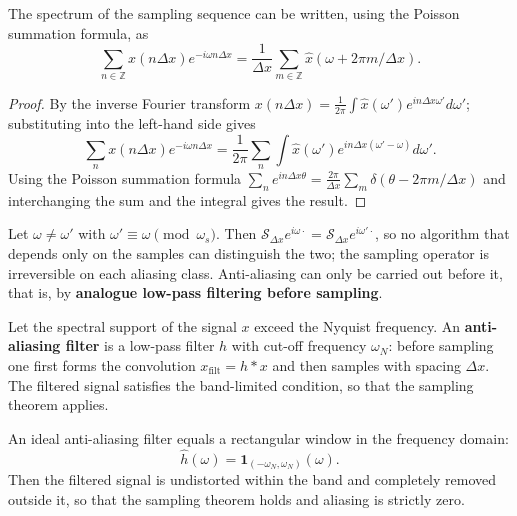 \begin{lemma}\label{lem:poisson_summation_sampling}
The spectrum of the sampling sequence can be written, using the Poisson summation formula, as
\[
\sum_{n\in\mathbb{Z}}x(n\Delta x)e^{-i\omega n\Delta x}
=\frac{1}{\Delta x}\sum_{m\in\mathbb{Z}}\hat x(\omega+2\pi m/\Delta x).
\]
\end{lemma}

\begin{proof}
By the inverse Fourier transform $x(n\Delta x)=\frac{1}{2\pi}\int\hat x(\omega')e^{in\Delta x\omega'}d\omega'$; substituting into the left-hand side gives
\[
\sum_n x(n\Delta x)e^{-i\omega n\Delta x}=\frac{1}{2\pi}\sum_n\int\hat x(\omega')e^{in\Delta x(\omega'-\omega)}d\omega'.
\]
Using the Poisson summation formula $\sum_ne^{in\Delta x\theta}=\frac{2\pi}{\Delta x}\sum_m\delta(\theta-2\pi m/\Delta x)$ and interchanging the sum and the integral gives the result.
\end{proof}

\begin{corollary}\label{cor:aliasing_irreversibility_parallel}
Let $\omega\ne\omega'$ with $\omega'\equiv\omega\pmod{\omega_s}$. Then $\mathcal{S}_{\Delta x}e^{i\omega\cdot}=\mathcal{S}_{\Delta x}e^{i\omega'\cdot}$, so no algorithm that depends only on the samples can distinguish the two; the sampling operator is irreversible on each aliasing class. Anti-aliasing can only be carried out before it, that is, by \textbf{analogue low-pass filtering before sampling}.
\end{corollary}

\begin{definition}\label{def:anti_aliasing_filter}
Let the spectral support of the signal $x$ exceed the Nyquist frequency. An \textbf{anti-aliasing filter} is a low-pass filter $h$ with cut-off frequency $\omega_N$: before sampling one first forms the convolution $x_{\text{filt}}=h*x$ and then samples with spacing $\Delta x$. The filtered signal satisfies the band-limited condition, so that the sampling theorem applies.
\end{definition}

\begin{property}\label{prop:anti_aliasing_ideal}
An ideal anti-aliasing filter equals a rectangular window in the frequency domain:
\[
\hat h(\omega)=\mathbf{1}_{(-\omega_N,\omega_N)}(\omega).
\]
Then the filtered signal is undistorted within the band and completely removed outside it, so that the sampling theorem holds and aliasing is strictly zero.
\end{property}

